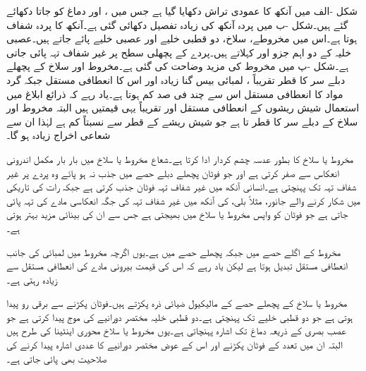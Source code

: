 شکل -الف میں آنکھ کا عمودی تراش دکھایا گیا ہے جس میں ،  اور دماغ کو جاتا  دکھائے گئے ہیں۔شکل -ب میں پردہ آنکھ کی زیادہ تفصیل دکھائی گئی ہے۔آنکھ کا پردہ شفاف ہوتا ہے۔اس میں مخروطے، سلاخ، دو قطبی خلیے اور  عصبی خلیے پائے جاتے ہیں۔عصبی خلیہ کے دو اہم جزو  اور  کہلاتے ہیں۔پردے کے پچھلی سطح پر غیر شفاف تہہ پائی جاتی ہے۔شکل -پ میں مخروط کی مزید وضاحت  کی گئی ہے۔مخروط اور سلاخ کے  پچھلے دبلے سر کا قطر تقریباً ، لمبائی بیس گنا زیادہ اور اس کا  انعطافی مستقل  جبکہ گرد مواد کا  انعطافی مستقل  اس سے چند فی صد کم ہوتا ہے۔یاد رہے کہ ذرائع ابلاغ میں استعمال شیش ریشوں کے  انعطافی مستقل  اور  تقریباً یہی قیمتیں ہیں البتہ مخروط اور سلاخ کے دبلے سر کا قطر  تا  ہے جو شیش ریشے کے قطر سے نسبتاً کم ہے لہٰذا ان سے شعاعی اخراج زیادہ ہو گا۔

مخروط یا سلاخ کا  بطور عدسہ چشم کردار ادا کرتا ہے۔شعاع مخروط یا سلاخ میں بار بار مکمل اندرونی انعکاس سے صفر کرتی ہے اور جو فوٹان پچھلے دبلے حصے میں جذب نہ ہو پائے وہ پردے پر غیر شفاف تہہ تک پہنچتی ہے۔انسانی آنکھ میں غیر شفاف تہہ فوٹان جذب کرتی ہے جبکہ رات کی تاریکی میں شکار کرنے والے جانور، مثلاً بلی،  کی آنکھ میں غیر شفاف تہہ کی جگہ انعکاسی مادے کی تہہ پائی جاتی ہے جو فوٹان کو واپس مخروط یا سلاخ میں بھیجتی ہے جس سے ان کی بینائی مزید بہتر ہوتی ہے۔ 

مخروط کے اگلے حصے میں  جبکہ پچھلے حصے میں  ہے۔یوں اگرچہ مخروط میں لمبائی کی جانب  انعطافی مستقل تبدیل ہوتا ہے لیکن یاد رہے کہ اس کی قیمت بیرونی مادے کی  انعطافی مستقل سے زیادہ رہتی ہے۔

مخروط یا سلاخ کے پچھلے حصے کے مالیکیول ضیائی ذرہ پکڑتے ہیں۔فوٹان پکڑنے سے برقی رو پیدا ہوتی ہے جو دو قطبی خلیے تک پہنچتی ہے۔دو قطبی خلیہ مختصر دورانیے کی موج پیدا کرتی ہے جو عصب بصری کے ذریعہ دماغ تک اشارہ پہنچاتی ہے۔یوں مخروط یا سلاخ محوری اینٹینا کی طرح ہیں البتہ ان میں  تعدد کے فوٹان پکڑنے اور اس کے عوض مختصر دورانیے کا عددی اشارہ پیدا کرنے کی صلاحیت بھی پائی جاتی ہے۔  

